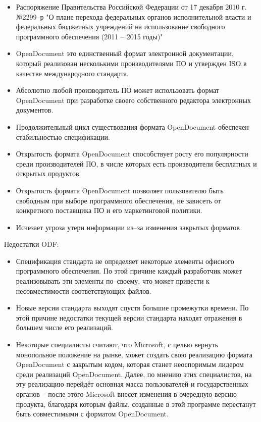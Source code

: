 \begin{itemize}
  \item Распоряжение Правительства Российской Федерации от 17 декабря 2010 г. №2299--р "О плане перехода федеральных органов исполнительной власти и федеральных бюджетных учреждений на использование свободного программного обеспечения (2011 -- 2015 годы)"
  \item OpenDocument это единственный формат электронной документации, который реализован несколькими производителями ПО и утвержден ISO в качестве международного стандарта.
  \item Абсолютно любой производитель ПО может использовать формат OpenDocument при разработке своего собственного редактора
электронных документов.
  \item Продолжительный цикл существования формата OpenDocument обеспечен стабильностью спецификации.
  \item Открытость формата OpenDocument способствует росту его популярности среди производителей ПО, в числе которых есть производители бесплатных и открытых продуктов. 
  \item Открытость формата OpenDocument позволяет пользователю быть свободным при выборе программного обеспечения, не зависеть от конкретного поставщика ПО и его маркетинговой политики.
  \item Исчезает угроза утери информации из--за изменения закрытых форматов
\end{itemize}
Недостатки ODF:
\begin{itemize}
  \item Спецификация  стандарта не определяет некоторые  элементы офисного программного обеспечения. По этой причине каждый разработчик может реализовывать эти элементы по--своему, что может привести к несовместимости соответствующих файлов.
  \item Новые версии стандарта выходят спустя большие промежутки времени. По этой причине недостатки текущей версии стандарта находят отражения в большем числе его реализаций.   
  \item Некоторые специалисты считают, что Microsoft, с целью вернуть монопольное положение на рынке, может создать свою реализацию формата OpenDocument с закрытым кодом,  которая  станет неоспоримым лидером среди реализаций OpenDocument. Далее, по мнению этих специалистов,  на эту реализацию перейдёт основная масса пользователей и государственных органов – после этого Microsoft внесёт изменения в очередную версию продукта, благодаря которым файлы, созданные в этой программе перестанут быть совместимыми с форматом OpenDocument.
\end{itemize}
